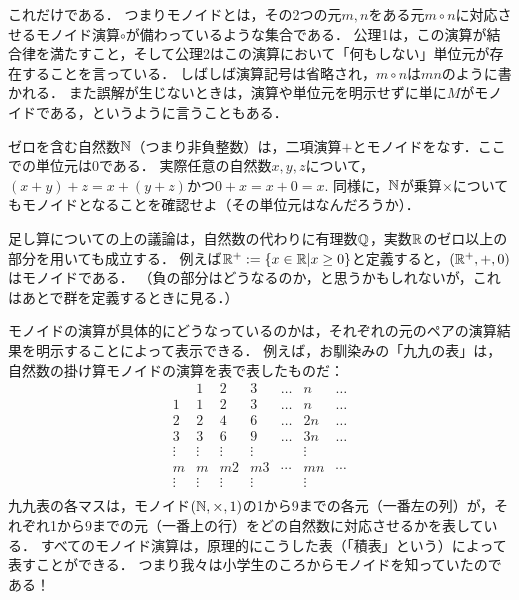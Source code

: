 \documentclass[11pt,a4paper, dvipdfmx]{jsarticle}
\begin{document}
これだけである．
つまりモノイドとは，その2つの元$m,n$をある元$m \circ n$に対応させるモノイド演算$\circ$が備わっているような集合である．
公理1は，この演算が結合律を満たすこと，そして公理2はこの演算において「何もしない」単位元が存在することを言っている．
しばしば演算記号は省略され，$m \circ n$は$mn$のように書かれる．
また誤解が生じないときは，演算や単位元を明示せずに単に$M$がモノイドである，というように言うこともある．


\begin{example}
ゼロを含む自然数$\mathbb{N}$（つまり非負整数）は，二項演算$+$とモノイドをなす．ここでの単位元は$0$である．
実際任意の自然数$x, y, z$について，$(x+y)+z = x + (y+z)$かつ$0 + x = x + 0 = x$. 
同様に，$\mathbb{N}$が乗算$\times$についてもモノイドとなることを確認せよ（その単位元はなんだろうか）．
\end{example}

\begin{example}
足し算についての上の議論は，自然数の代わりに有理数$\mathbb{Q}$，実数$\mathbb{R}$のゼロ以上の部分を用いても成立する．
例えば$\mathbb{R}^+ := \{ x \in \mathbb{R} | x \geq 0 \}$と定義すると，$(\mathbb{R}^+, +, 0)$はモノイドである．
（負の部分はどうなるのか，と思うかもしれないが，これはあとで群を定義するときに見る．）
\end{example}

モノイドの演算が具体的にどうなっているのかは，それぞれの元のペアの演算結果を明示することによって表示できる．
例えば，お馴染みの「九九の表」は，自然数の掛け算モノイドの演算を表で表したものだ：
\[
\begin{array}{c|cccccc}
       & 1 & 2 & 3 & \dots & n & \dots \\ \hline
     1 & 1 & 2 & 3 & \dots & n & \dots \\ 
     2 & 2 & 4 & 6 & \dots & 2n & \dots \\ 
     3 & 3 & 6 & 9 & \dots & 3n & \dots \\ 
     \vdots & \vdots & \vdots & \vdots & & \vdots & \\
     m & m & m2 & m3 & \cdots & mn & \cdots \\
     \vdots & \vdots & \vdots & \vdots & & \vdots & \\
\end{array}
\]
九九表の各マスは，モノイド$(\mathbb{N}, \times, 1)$の1から9までの各元（一番左の列）が，それぞれ1から9までの元（一番上の行）をどの自然数に対応させるかを表している．
すべてのモノイド演算は，原理的にこうした表（「積表」という）によって表すことができる．
つまり我々は小学生のころからモノイドを知っていたのである！
\end{document}

